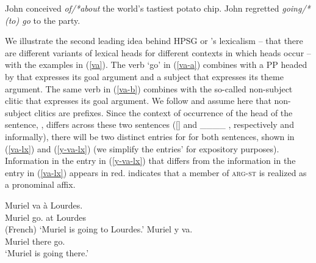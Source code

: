 \documentclass[output=paper
 	        ,biblatex
                ,babelshorthands
                ,newtxmath
                ,draftmode
                ,colorlinks, citecolor=brown
]{langscibook}
\begin{document}
\eal
\label{select}
\ex\label{select-a}John conceived \emph{of/*about} the world's tastiest potato chip.
\ex\label{select-b} John regretted \emph{going/*(to) go} to the party.
\zl


We illustrate the second leading idea behind HPSG or \lfg's lexicalism -- that there are different variants of lexical heads for different contexts in which heads occur -- with the  examples in (\ref{va}). The verb  `go' in (\ref{va-a}) combines with a PP headed by  that expresses its goal argument and a subject that expresses its theme argument. The same verb in (\ref{va-b}) combines with the so-called non-subject clitic  that expresses its goal argument. We follow \citet{MillerandSag1997} and assume here that  non-subject clitics are prefixes. Since the context of occurrence of the head of the sentence, , differs across these two sentences ([] and  \_\_\_\_ , respectively and informally), there will be two distinct entries for  for both sentences, shown in (\ref{va-lx}) and (\ref{y-va-lx}) (we simplify the entries'  for expository purposes). Information in the entry in (\ref{y-va-lx}) that differs from the information in the entry in (\ref{va-lx}) appears in red.  indicates that a member of \textsc{arg-st} is realized as a pronominal affix.

\eal
\label{va}
\ex\label{va-a} 
\gll Muriel va à Lourdes. \\
     Muriel go. at Lourdes \\\hfill(French)
     \glt `Muriel is going to Lourdes.'
\ex\label{va-b}
\gll Muriel y va. \\
     Muriel there go. \\
 \glt `Muriel is going there.'
\zl
{}

\ea
\label{va-lx}
\z
\end{document}
